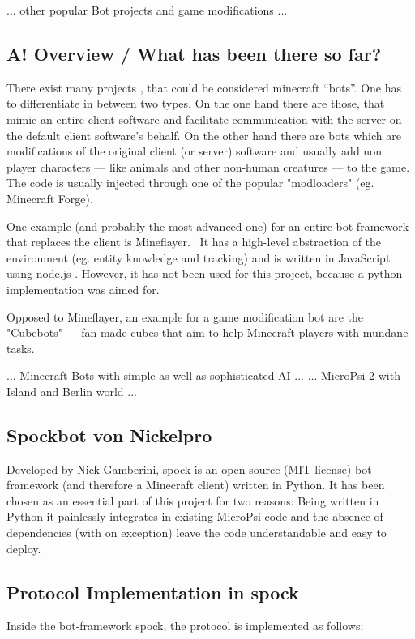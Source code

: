         ... other popular Bot projects and game modifications ...
    
        \subsection{A! Overview / What has been there so far?}
There exist many projects , that could be considered minecraft ``bots''. One has to differentiate in between two types. On the one hand there are those, that mimic an entire client software and facilitate communication with the server on the default client software's behalf. On the other hand there are bots which are modifications of the original client (or server) software and usually add non player characters --- like animals and other non-human creatures --- to the game. The code is usually injected through one of the popular "modloaders" (eg. Minecraft Forge).

One example (and probably the most advanced one) for an entire bot framework that replaces the client is Mineflayer.~\cite{github_mineflayer} It has a high-level abstraction of the environment (eg. entity knowledge and tracking) and is written in JavaScript using node.js . However, it has not been used for this project, because a python implementation was aimed for.

Opposed to Mineflayer, an example for a game modification bot are the "Cubebots" --- fan-made cubes that aim to help Minecraft players with mundane tasks.\cite{mcforums_cubebots}

... Minecraft Bots with simple as well as sophisticated AI ...
... MicroPsi 2 with Island and Berlin world ...

        \subsection{Spockbot von Nickelpro}
Developed by Nick Gamberini, spock is an open-source (MIT license) bot framework (and therefore a Minecraft client) written in Python. It has been chosen as an essential part of this project for two reasons: Being written in Python it painlessly integrates in existing MicroPsi code and the absence of dependencies (with on exception) leave the code understandable and easy to deploy.
    
        \subsection{Protocol Implementation in spock}
Inside the bot-framework spock, the protocol is implemented as follows:

